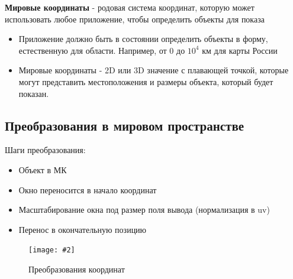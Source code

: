 \documentclass[a4paper, 14pt]{extarticle}
\newcommand{\definition}[1]{\textbf{#1}}
\newcommand{\screenshot}[3]{
	\begin{figure}[h]
		\centering
		\texttt{[image: \#2]}
		\caption{#3}
	\end{figure}
}
\begin{document}
\definition{Мировые координаты} - родовая система координат, которую может использовать любое приложение, чтобы определить объекты для показа
\begin{itemize}
	\item Приложение должно быть в состоянии определить объекты в форму, естественную для области. Например, от $0$ до $10^4$  км для карты России
	\item Мировые координаты - 2D или 3D значение с плавающей точкой, которые могут представить местоположения и размеры объекта, который будет показан.
\end{itemize}

\subsection{Преобразования в мировом пространстве}
Шаги преобразования:
\begin{itemize}
	\item Объект в МК
	\item Окно переносится в начало координат
	\item Масштабирование окна под размер поля вывода (нормализация в uv)
	\item Перенос в окончательную позицию
\end{itemize}
\screenshot{width=12cm}{l4/S004.jpg}{Преобразования координат}
\end{document}
